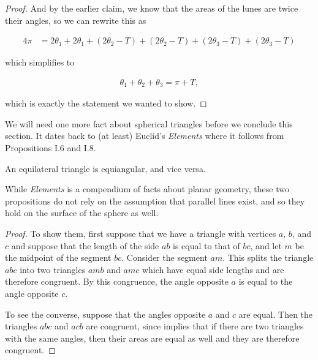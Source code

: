 \begin{proof}
And by the earlier claim, we know that the areas of the lunes are twice their angles, so we can rewrite this as


	\begin{align*}
4\pi &= 2\theta_1 + 2\theta_1 
+  (2\theta_2 - T) + (2\theta_2-T) 
+ (2\theta_3 - T)	 + (2\theta_3 - T)
\end{align*}

which simplifies to 

	\begin{align*}
\theta_1+\theta_2+\theta_3 = \pi + T,
\end{align*}

which is exactly the statement we wanted to show.
\end{proof}

We will need one more fact about spherical triangles before we conclude this section.  It dates back to (at least) Euclid's \textit{Elements} \cite{elements} where it follows from Propositions I.6 and I.8.  

\begin{claim}
	An equilateral triangle is equiangular, and vice versa.
\end{claim}

While \textit{Elements} is a compendium of facts about planar geometry, these two propositions do not rely on the assumption that parallel lines exist, and so they hold on the surface of the sphere as well.  
\begin{proof}
To show them, first suppose that we have a triangle with vertices $a$, $b$, and $c$ and suppose that the length of the side $ab$ is equal to that of $bc$, and let $m$ be the midpoint of the segment $bc$.  Consider the segment $am$. This splits the triangle $abc$ into two triangles $amb$ and $amc$ which have equal side lengths and are therefore congruent.  By this congruence, the angle opposite $a$ is equal to the angle opposite $c$.

To see the converse, suppose that the angles opposite $a$ and $c$ are equal.  Then the triangles $abc$ and $acb$ are congruent, since  implies that if there are two triangles with the same angles, then their areas are equal as well and they are therefore congruent.
\end{proof}

